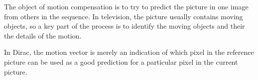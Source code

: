 The object of motion compensation is to try to predict the picture in
one image from others in the sequence. In television, the picture
usually contains moving objects, so a key part of the process is to
identify the moving objects and their the details of the motion.

In Dirac, the motion vector is merely an indication of which pixel in
the reference picture can be used as a good prediction for a particular
pixel in the current picture.
